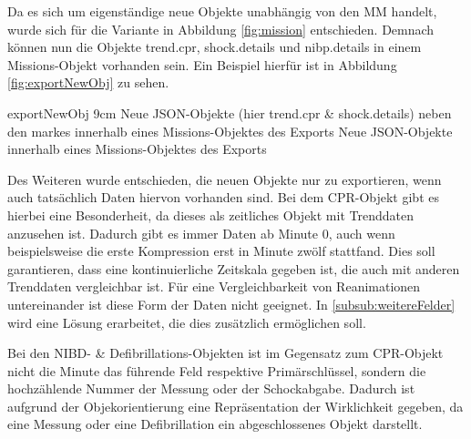 Da es sich um eigenständige neue Objekte unabhängig von den \gls{MM} handelt, wurde sich für die Variante in Abbildung \ref{fig:mission} entschieden.
Demnach können nun die Objekte \glqq trend.cpr\grqq, \glqq shock.details\grqq{} und \glqq nibp.details\grqq{} in einem Missions-Objekt vorhanden sein.
Ein Beispiel hierfür ist in Abbildung \ref{fig:exportNewObj} zu sehen.

\bild
{exportNewObj}
{9cm}
{Neue JSON-Objekte (hier \glqq trend.cpr\grqq{} \& \glqq shock.details\grqq{}) neben den \glqq markes\grqq{} innerhalb eines Missions-Objektes des Exports}
{Neue JSON-Objekte innerhalb eines Missions-Objektes des Exports}


Des Weiteren wurde entschieden, die neuen Objekte nur zu exportieren, wenn auch tatsächlich Daten hiervon vorhanden sind.
Bei dem \gls{CPR}-Objekt gibt es hierbei eine Besonderheit, da dieses als zeitliches Objekt mit Trenddaten anzusehen ist.
Dadurch gibt es immer Daten ab Minute 0, auch wenn beispielsweise die erste Kompression erst in Minute zwölf stattfand.
Dies soll garantieren, dass eine kontinuierliche Zeitskala gegeben ist, die auch mit anderen Trenddaten vergleichbar ist.
Für eine Vergleichbarkeit von Reanimationen untereinander ist diese Form der Daten nicht geeignet. 
In \ref{subsub:weitereFelder} wird eine Lösung erarbeitet, die dies zusätzlich ermöglichen soll.

Bei den \gls{NIBD}- \& Defibrillations-Objekten ist im Gegensatz zum CPR-Objekt nicht die Minute das führende Feld respektive Primärschlüssel, sondern die hochzählende Nummer der Messung oder der Schockabgabe.
Dadurch ist aufgrund der Objekorientierung eine Repräsentation der Wirklichkeit gegeben, da eine Messung oder eine Defibrillation ein abgeschlossenes Objekt darstellt.




